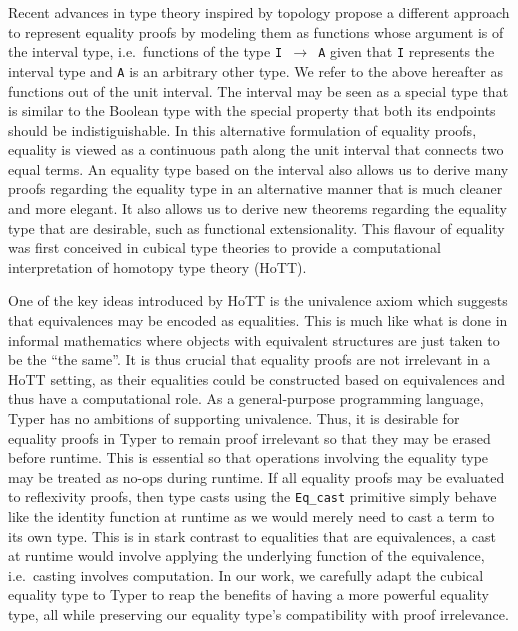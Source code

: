 \documentclass[12pt,twoside,maitrise]{dms}
\theoremstyle{definition}
\numberwithin{equation}{section}
\numberwithin{table}{chapter}
\numberwithin{figure}{chapter}
\newcommand\id[1] {\texttt{#1}}
\newcommand\fn[1] {\texttt{#1}}
\begin{document}
Recent advances in type theory inspired by topology propose a different approach
to represent equality proofs by modeling them as functions whose argument is of
the interval type, i.e.\ functions of the type \fn{I $\rightarrow$ A} given that
\id{I} represents the interval type and \id{A} is an arbitrary other type. We
refer to the above hereafter as functions out of the unit interval. The interval
may be seen as a special type that is similar to the Boolean type with the
special property that both its endpoints should be indistiguishable. In this
alternative formulation of equality proofs, equality is viewed as a continuous
path along the unit interval that connects two equal terms.
An equality type based on the interval also allows us to derive many proofs
regarding the equality type in an alternative manner that is much cleaner and
more elegant. It also allows us to derive new theorems regarding the equality
type that are desirable, such as functional extensionality. This flavour of
equality was first conceived in cubical type theories\cite{bezem2014model} to
provide a computational interpretation of homotopy type theory
(HoTT)\cite{HoTTbook}.

One of the key ideas introduced by HoTT is the univalence axiom which suggests
that equivalences may be encoded as equalities. This is much like what is done
in informal mathematics where objects with equivalent structures are just taken
to be the ``the same''. It is thus crucial that equality proofs are not
irrelevant in a HoTT setting, as their equalities could be constructed based on
equivalences and thus have a computational role. As a general-purpose
programming language, Typer has no ambitions of supporting univalence. Thus, it
is desirable for equality proofs in Typer to remain proof irrelevant so that
they may be erased before runtime. This is essential so that operations
involving the equality type may be treated as no-ops during runtime. If all
equality proofs may be evaluated to reflexivity proofs, then type casts using
the \fn{Eq\_cast} primitive simply behave like the identity function at runtime
as we would merely need to cast a term to its own type. This is in stark
contrast to equalities that are equivalences, a cast at runtime would involve
applying the underlying function of the equivalence, i.e.\ casting involves
computation. In our work, we carefully adapt the cubical equality type to Typer
to reap the benefits of having a more powerful equality type, all while
preserving our equality type's compatibility with proof irrelevance.
\end{document}

